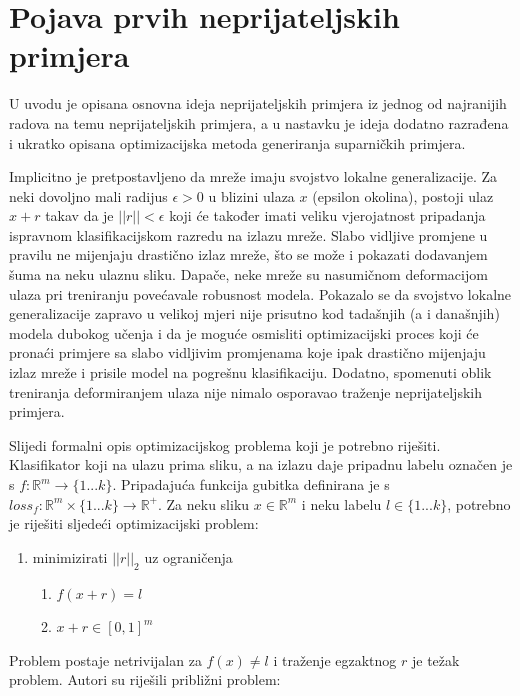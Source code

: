 \documentclass[utf8, diplomski]{fer}
\begin{document}
\section{Pojava prvih neprijateljskih primjera}
U uvodu je opisana osnovna ideja neprijateljskih primjera iz jednog od najranijih radova na temu neprijateljskih primjera\citep{Szegedy2014IntriguingPO}, a u nastavku je ideja dodatno razrađena i ukratko opisana optimizacijska metoda generiranja suparničkih primjera.
\par
Implicitno je pretpostavljeno da mreže imaju svojstvo lokalne generalizacije. Za neki dovoljno mali radijus $\epsilon > 0$ u blizini ulaza $x$ (epsilon okolina), postoji ulaz $x + r$ takav da je $||r|| < \epsilon$ koji će također imati veliku vjerojatnost pripadanja ispravnom klasifikacijskom razredu na izlazu mreže. Slabo vidljive promjene u pravilu ne mijenjaju drastično izlaz mreže, što se može i pokazati dodavanjem šuma na neku ulaznu sliku. Dapače, neke mreže su nasumičnom deformacijom ulaza pri treniranju povećavale robusnost modela. Pokazalo se da svojstvo lokalne generalizacije zapravo u velikoj mjeri nije prisutno kod tadašnjih (a i današnjih) modela dubokog učenja i da je moguće osmisliti optimizacijski proces koji će pronaći primjere sa slabo vidljivim promjenama koje ipak drastično mijenjaju izlaz mreže i prisile model na pogrešnu klasifikaciju. Dodatno, spomenuti oblik treniranja deformiranjem ulaza nije nimalo osporavao traženje neprijateljskih primjera.
\par
Slijedi formalni opis optimizacijskog problema koji je potrebno riješiti. \\
Klasifikator koji na ulazu prima sliku, a na izlazu daje pripadnu labelu označen je s $f : \mathbb{R}^{m} \rightarrow \{1...k\}$. Pripadajuća funkcija gubitka definirana je s $loss_{f} : \mathbb{R}^{m}\times\{1...k\} \rightarrow \mathbb{R}^{+}$. Za neku sliku $x \in \mathbb{R}^{m}$ i neku labelu $l \in \{1...k\}$, potrebno je riješiti sljedeći optimizacijski problem:
\begin{enumerate}[noitemsep, label=\textbullet]
  \item minimizirati $||r||_{2}$ uz ograničenja
  \begin{enumerate}
  \item $f(x+r) = l$
  \item $x + r \in [0, 1]^{m}$
  \end{enumerate}
\end{enumerate}
Problem postaje netrivijalan za $f(x) \neq l$ i traženje egzaktnog $r$ je težak problem. Autori su riješili približni problem:
\end{document}
